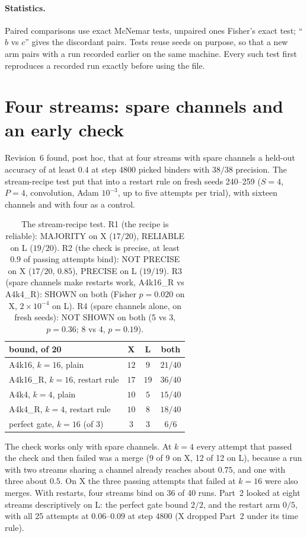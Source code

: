 \documentclass[11pt]{article}
\newcommand{\arm}[1]{\textsf{#1}}
\begin{document}
\paragraph{Statistics.} Paired comparisons use exact McNemar tests, unpaired ones Fisher's exact test; ``$b$ vs $c$'' gives the discordant pairs. Tests reuse seeds on purpose, so that a new arm pairs with a run recorded earlier on the same machine. Every such test first reproduces a recorded run exactly before using the file.

\section{Four streams: spare channels and an early check}
\label{sec:recipe}

Revision~6 found, post hoc, that at four streams with spare channels a held-out accuracy of at least $0.4$ at step 4800 picked binders with $38/38$ precision. The stream-recipe test put that into a restart rule on fresh seeds 240--259 ($S = 4$, $P = 4$, convolution, Adam $10^{-3}$, up to five attempts per trial), with sixteen channels and with four as a control.

\begin{table}[h]
\centering
\small
\begin{tabular}{@{}lccc@{}}
\toprule
bound, of 20 & X & L & both\\
\midrule
\arm{A4k16}, $k = 16$, plain & $12$ & $9$ & $21/40$\\
\arm{A4k16\_R}, $k = 16$, restart rule & $17$ & $19$ & $36/40$\\
\arm{A4k4}, $k = 4$, plain & $10$ & $5$ & $15/40$\\
\arm{A4k4\_R}, $k = 4$, restart rule & $10$ & $8$ & $18/40$\\
perfect gate, $k = 16$ (of 3) & $3$ & $3$ & $6/6$\\
\bottomrule
\end{tabular}
\caption{The stream-recipe test. R1 (the recipe is reliable): MAJORITY on X ($17/20$), RELIABLE on L ($19/20$). R2 (the check is precise, at least $0.9$ of passing attempts bind): NOT PRECISE on X ($17/20$, $0.85$), PRECISE on L ($19/19$). R3 (spare channels make restarts work, \arm{A4k16\_R} vs \arm{A4k4\_R}): SHOWN on both (Fisher $p = 0.020$ on X, $2\times10^{-4}$ on L). R4 (spare channels alone, on fresh seeds): NOT SHOWN on both (5 vs 3, $p = 0.36$; 8 vs 4, $p = 0.19$).}
\label{tab:recipe}
\end{table}

\noindent
The check works only with spare channels. At $k = 4$ every attempt that passed the check and then failed was a merge (9 of 9 on X, 12 of 12 on L), because a run with two streams sharing a channel already reaches about $0.75$, and one with three about $0.5$. On X the three passing attempts that failed at $k = 16$ were also merges. With restarts, four streams bind on $36$ of 40 runs. Part~2 looked at eight streams descriptively on L: the perfect gate bound $2/2$, and the restart arm $0/5$, with all 25 attempts at $0.06$--$0.09$ at step 4800 (X dropped Part~2 under its time rule).
\end{document}
